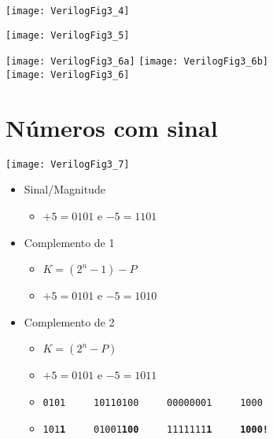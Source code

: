 \begin{frame}{\insertsection} \center
    \texttt{[image: VerilogFig3\_4]}
\end{frame}

\begin{frame}{\insertsection} \center
    \texttt{[image: VerilogFig3\_5]}
\end{frame}

\begin{frame}{\insertsection} \center
    \texttt{[image: VerilogFig3\_6a]}
    \texttt{[image: VerilogFig3\_6b]} \\
    \texttt{[image: VerilogFig3\_6]}
\end{frame}

\section{Números com sinal}

\begin{frame}{\insertsection} \center
    \texttt{[image: VerilogFig3\_7]}
\end{frame}

\begin{frame}{\insertsection} 
    \begin{itemize}
        \item Sinal/Magnitude 
        \begin{itemize}
            \item $+5 = 0101$ e $-5 = 1101$
        \end{itemize}
        \pause
        \item Complemento de 1 
        \begin{itemize}
            \item $K = (2^n - 1) - P$
            \item $+5 = 0101$ e $-5 = 1010$
        \end{itemize}
        \pause
        \item Complemento de 2
        \begin{itemize}
            \item $K = (2^n - P)$
            \item $+5 = 0101$ e $-5 = 1011$
            \item {\tt 0101~~~~~10110100~~~~~00000001~~~~~1000}
            \item {\tt 101\textbf{1}~~~~~01001\textbf{100}~~~~~1111111\textbf{1}~~~~~\textbf{1000!}}
        \end{itemize}
    \end{itemize}
\end{frame}

